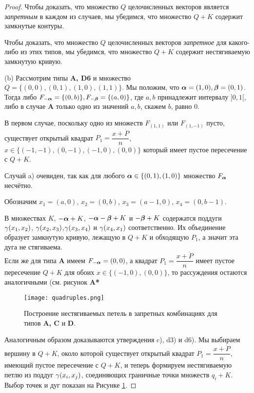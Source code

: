 \begin{proof} 
Чтобы доказать, что множество $Q$ целочисленных векторов является {\em запретным} в каждом из случаев, мы убедимся, что множество $Q+K$ содержит замкнутые контуры.

Чтобы доказать, что множество $Q$ целочисленных векторов {\em запретное} для какого-либо из этих типов, мы убедимся, что множество $Q+K$ содержит нестягиваемую замкнутую  кривую.

(b)  Рассмотрим типы {\bf A, D6} и множество $Q=\{(0,0), (0,1), (1,0), (1,1)\}$. Мы положим, что ${\bm{\alpha}}=(1,0), {\bm{\beta}}=(0,1)$. Тогда   либо $F_{-{\bm{\alpha}}}=\{(0,b)\}, F_{-{\bm{\beta}}}=\{(a,0)\}$, где $a,b$ принадлежит интервалу $]0,1[$,  либо в случае {\bf A} только одно из значений $a,b$, скажем $b$, равно 0.


В первом случае, поскольку одно из множеств $F_{(1,1)}$ или $F_{(1,-1)}$ пусто, существует открытый квадрат $P_1=\dfrac{x+\dot P}{n}$, $x\in \{(-1,-1),(0,-1), (-1,0), (0,0)\}$ который имеет пустое пересечение  с $Q+K$. 

Случай a) очевиден, так как для любого ${\bm{\alpha}}\in\{(0,1),(1,0)\}$ множество $F_{\bm{\alpha}}$ несчётно.

Обозначим $x_1=(a,0)$, 
$x_2=(0,b)$, $x_3=(a-1,0)$, $x_4=(0,b-1)$. 

 В множествах  $K$, $-{\bm{\alpha}}+K$, $-{\bm{\alpha}}-{\bm{\beta}}+K$ и $-{\bm{\beta}}+K$ содержатся поддуги  $\gamma(x_1,x_2)$, $\gamma(x_2,x_3)$,$\gamma(x_3,x_4)$ и $\gamma(x_4,x_1)$ соответственно. Их объединение
 образует замкнутую кривую, лежащую в $Q+K$ и обходящую $P_1$, а значит эта дуга не стягиваема.\\ 

Если же для типа {\bf A} имеем $F_{-{\bm{\alpha}}}=(0,0)$, а квадрат $P_1=\dfrac{x+\dot P}{n}$ имеет пустое пересечение $Q+K$ для обоих $x\in\{(-1,0), (0,0)\}$, то рассуждения остаются аналогичными (см. рисунок {\bf A*}

\begin{figure}[h] 
    \centering
    \texttt{[image: quadruples.png]}
    \caption{Построение нестягиваемых петель в запретных комбинациях для типов {\bf A, C} и {\bf D}.}
    \label{forbid}
\end{figure}

Аналогичным образом доказываются утверждения c), d3) и d6).
Мы выбираем вершину в $Q+K$, около которой существует открытый квадрат $P_1=\dfrac{x+\dot P}{n}$, имеющий пустое пересечение с $Q+K$, и теперь формируем нестягиваемую петлю из поддуг $\gamma(x_i,x_j)$, соединяющих граничные точки множеств $q_i+K$.
Выбор точек и дуг показан на Рисунке \ref{forbid}.
\end{proof}


